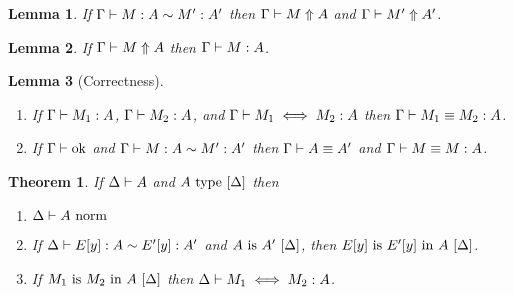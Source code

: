 \documentclass{article}
\theoremstyle{break}
\newtheorem{theorem}{Theorem}
\newtheorem{lemma}{Lemma}
\begin{document}
\begin{lemma}
\label{lemma:weaktoreconstruct}
If $\Gamma\vdash M : A \sim M' : A'$ then
$\Gamma\vdash M \Uparrow A$ and
$\Gamma\vdash M' \Uparrow A'$.
\end{lemma}

\begin{lemma}
\label{lemma:reconstructtovalid}
If $\Gamma\vdash M \Uparrow A$ then
$\Gamma\vdash M : A$.
\end{lemma}

\begin{lemma}[Correctness]
\label{lemma:Correctness}
\begin{enumerate}
\item If $\Gamma\vdash M_1 : A$,
$\Gamma\vdash M_2 : A$, and
$\Gamma\vdash M_1 \iff M_2 : A$ then
$\Gamma\vdash M_1 \equiv M_2 : A$.
\item If ${\Gamma}\vdash\mbox{ok}$ and 
$\Gamma\vdash M : A \sim M' : A'$ then
$\Gamma\vdash A \equiv A'$ and
$\Gamma\vdash M \equiv M : A$.
\end{enumerate}
\end{lemma}

\begin{theorem}
\label{maintheorem}
If $\Delta\vdash A$ and ${A}\mathrm{\ type\ }[\Delta]$ then
\begin{enumerate}
\item 
\label{ih-1}
${\Delta}\vdash{A}\mbox{\ norm}$

\item
\label{ih-3}
If 
$\Delta\vdash E[y] : A \sim E'[y] : A'$ and
${A}\mathrm{\ is\ }{A'}\ [\Delta]$,
then
${E[y]}\mathrm{\ is\ }{E'[y]}\mathrm{\ in\ }{A}\ [\Delta]$.

\item
\label{ih-5}
If ${M_1}\mathrm{\ is\ }{M_2}\mathrm{\ in\ }{A}\ [\Delta]$ then
$\Delta\vdash M_1 \iff M_2 : A$.
\end{enumerate}
\end{theorem}
\end{document}
